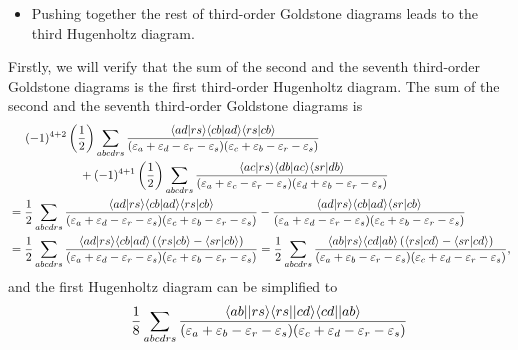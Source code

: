 \documentclass[a4paper]{book}
\newcounter{solution}[chapter]
\begin{document}
\begin{solution}
\begin{itemize}
	\item Pushing together the rest of third-order Goldstone diagrams leads to the third Hugenholtz diagram.
	
	\end{itemize}
	
	Firstly, we will verify that the sum of the second and the seventh third-order Goldstone diagrams is the first third-order Hugenholtz diagram. The sum of the second and the seventh third-order Goldstone diagrams is
	\begin{align*}
		&\hspace{1.4em} (-1)^{4+2} \left( \frac{1}{2} \right) \sum_{abcdrs} \frac{ \langle ad | rs \rangle \langle cb | ad \rangle \langle rs | cb \rangle }{ ( \varepsilon_a + \varepsilon_d - \varepsilon_r - \varepsilon_s ) ( \varepsilon_c + \varepsilon_b - \varepsilon_r - \varepsilon_s ) } \\
		&\hspace{6em} + (-1)^{4+1} \left( \frac{1}{2} \right) \sum_{abcdrs} \frac{ \langle ac | rs \rangle \langle db | ac \rangle \langle sr | db \rangle }{ ( \varepsilon_a + \varepsilon_c - \varepsilon_r - \varepsilon_s ) ( \varepsilon_d + \varepsilon_b - \varepsilon_r - \varepsilon_s ) } \\
		&= \frac{1}{2} \sum_{abcdrs} \frac{ \langle ad | rs \rangle \langle cb | ad \rangle \langle rs | cb \rangle }{ ( \varepsilon_a + \varepsilon_d - \varepsilon_r - \varepsilon_s ) ( \varepsilon_c + \varepsilon_b - \varepsilon_r - \varepsilon_s ) } - \frac{ \langle ad | rs \rangle \langle cb | ad \rangle \langle sr | cb \rangle }{ ( \varepsilon_a + \varepsilon_d - \varepsilon_r - \varepsilon_s ) ( \varepsilon_c + \varepsilon_b - \varepsilon_r - \varepsilon_s ) } \\
		&= \frac{1}{2} \sum_{abcdrs} \frac{ \langle ad | rs \rangle \langle cb | ad \rangle \left( \langle rs | cb \rangle - \langle sr | cb \rangle \right) }{ ( \varepsilon_a + \varepsilon_d - \varepsilon_r - \varepsilon_s ) ( \varepsilon_c + \varepsilon_b - \varepsilon_r - \varepsilon_s ) } = \frac{1}{2} \sum_{abcdrs} \frac{ \langle ab | rs \rangle \langle cd | ab \rangle \left( \langle rs | cd \rangle - \langle sr | cd \rangle \right) }{ ( \varepsilon_a + \varepsilon_b - \varepsilon_r - \varepsilon_s ) ( \varepsilon_c + \varepsilon_d - \varepsilon_r - \varepsilon_s ) },
	\end{align*}
	and the first Hugenholtz diagram can be simplified to
	\begin{align*}
		&\hspace{1.4em} \frac{1}{8} \sum_{abcdrs} \frac{ \langle ab || rs \rangle \langle rs || cd \rangle \langle cd || ab \rangle }{ ( \varepsilon_a + \varepsilon_b - \varepsilon_r - \varepsilon_s ) ( \varepsilon_c + \varepsilon_d - \varepsilon_r - \varepsilon_s ) } \\

\end{align*}
\end{solution}
\end{document}
